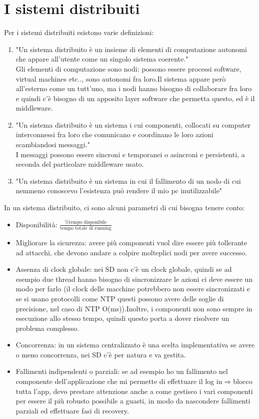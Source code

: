 \documentclass{article}
\begin{document}
\section{I sistemi distribuiti}
Per i sistemi distribuiti esistono varie definizioni:
\begin{enumerate}
\item "Un sistema distribuito è un insieme di elementi di computazione autonomi che appare all'utente come un singolo sistema coerente."\\Gli elementi di computazione sono nodi: possono essere processi software, virtual machines etc.., sono autonomi fra loro.Il sistema appare però all'esterno come un tutt'uno, ma i nodi hanno bisogno di collaborare fra loro e quindi c'è bisogno di un apposito layer software che permetta questo, ed è il middleware.
\item "Un sistema distribuito è un sistema i cui componenti, collocati su computer interconnessi fra loro che comunicano e coordinano le loro azioni scambiandosi messaggi."\\I messaggi possono essere sincroni e temporanei o asincroni e persistenti, a seconda del particolare middleware usato.
\item "Un sistema distribuito è un sistema in cui il fallimento di un nodo di cui nemmeno conoscevo l'esistenza può rendere il mio pc inutilizzabile"
\end{enumerate}
In un sistema distribuito, ci sono alcuni parametri di cui bisogna tenere conto:
\begin{itemize}
\item Disponibilità: $\frac{\% \text{tempo disponibile}}{\text{tempo totale di running}}$
\item Migliorare la sicurezza: avere più componenti vuol dire essere più tollerante ad attacchi, che devono andare a colpire molteplici nodi per avere successo.
\item Assenza di clock globale: nei SD non c'è un clock globale, quindi se ad esempio due thread hanno bisogno di sincronizzare le azioni ci deve essere un modo per farlo (il clock delle macchine potrebbero non essere sincronizzati e se si usano protocolli come NTP questi possono avere delle soglie di precisione, nel caso di NTP O(ms)).Inoltre, i componenti non sono sempre in esecuzione allo stesso tempo, quindi questo porta a dover risolvere un problema complesso.
\item Concorrenza: in un sistema centralizzato è una scelta implementativa se avere o meno concorrenza, nei SD c'è per natura e va gestita.
\item Fallimenti indipendenti o parziali: se ad esempio ho un fallimento nel componente dell'applicazione che mi permette di effettuare il log in$\Rightarrow$blocco tutta l'app, devo prestare attenzione anche a come gestisco i vari componenti per essere il più robusto possibile a guasti, in modo da nascondere fallimenti parziali ed effettuare fasi di recovery.
\end{itemize} 
\end{document}
